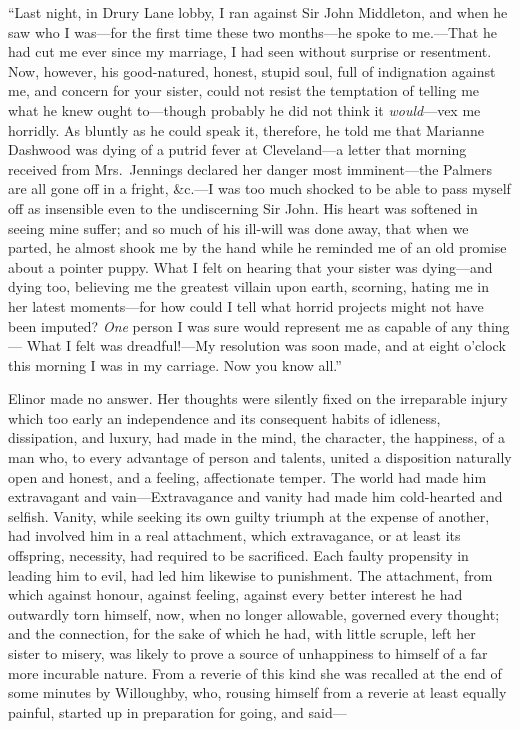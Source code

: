 ``Last night, in Drury Lane lobby, I ran against Sir
John Middleton, and when he saw who I was---for the first
time these two months---he spoke to me.---That he had cut
me ever since my marriage, I had seen without surprise
or resentment.  Now, however, his good-natured, honest,
stupid soul, full of indignation against me, and concern
for your sister, could not resist the temptation of telling
me what he knew ought to---though probably he did not
think it \emph{would}---vex me horridly.  As bluntly as he could
speak it, therefore, he told me that Marianne Dashwood
was dying of a putrid fever at Cleveland---a letter that
morning received from Mrs.\ Jennings declared her danger
most imminent---the Palmers are all gone off in a fright,
\&c.---I was too much shocked to be able to pass myself
off as insensible even to the undiscerning Sir John.
His heart was softened in seeing mine suffer; and so much
of his ill-will was done away, that when we parted,
he almost shook me by the hand while he reminded me of an
old promise about a pointer puppy.  What I felt on hearing
that your sister was dying---and dying too, believing me
the greatest villain upon earth, scorning, hating me
in her latest moments---for how could I tell what horrid
projects might not have been imputed?  \emph{One} person I
was sure would represent me as capable of any thing---%
What I felt was dreadful!---My resolution was soon made,
and at eight o'clock this morning I was in my carriage.
Now you know all.''

Elinor made no answer.  Her thoughts were silently fixed
on the irreparable injury which too early an independence
and its consequent habits of idleness, dissipation, and luxury,
had made in the mind, the character, the happiness,
of a man who, to every advantage of person and talents,
united a disposition naturally open and honest, and a
feeling, affectionate temper.  The world had made him
extravagant and vain---Extravagance and vanity had made him
cold-hearted and selfish.  Vanity, while seeking its own
guilty triumph at the expense of another, had involved
him in a real attachment, which extravagance, or at least
its offspring, necessity, had required to be sacrificed.
Each faulty propensity in leading him to evil, had led
him likewise to punishment.  The attachment, from which
against honour, against feeling, against every better interest
he had outwardly torn himself, now, when no longer allowable,
governed every thought; and the connection, for the sake
of which he had, with little scruple, left her sister
to misery, was likely to prove a source of unhappiness
to himself of a far more incurable nature.  From a reverie
of this kind she was recalled at the end of some minutes
by Willoughby, who, rousing himself from a reverie at least
equally painful, started up in preparation for going, and said---%

